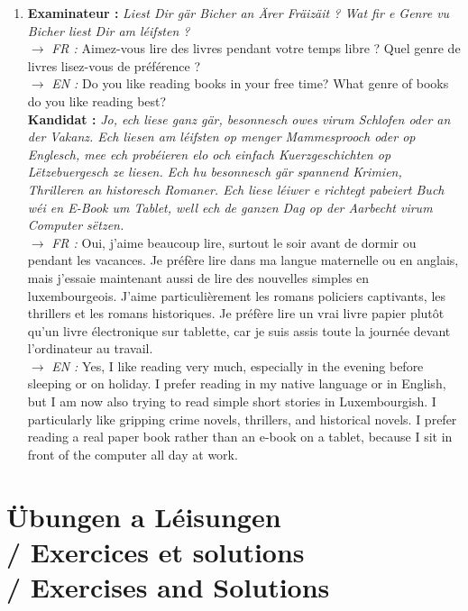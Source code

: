 \begin{enumerate}
    \item \textbf{Examinateur :} \textit{Liest Dir gär Bicher an Ärer Fräizäit ? Wat fir e Genre vu Bicher liest Dir am léifsten ?} \\
    $\rightarrow$ \textit{FR :} Aimez-vous lire des livres pendant votre temps libre ? Quel genre de livres lisez-vous de préférence ? \\
    $\rightarrow$ \textit{EN :} Do you like reading books in your free time? What genre of books do you like reading best? \\
    \textbf{Kandidat :} \textit{Jo, ech liese ganz gär, besonnesch owes virum Schlofen oder an der Vakanz. Ech liesen am léifsten op menger Mammesprooch oder op Englesch, mee ech probéieren elo och einfach Kuerzgeschichten op Lëtzebuergesch ze liesen. Ech hu besonnesch gär spannend Krimien, Thrilleren an historesch Romaner. Ech liese léiwer e richtegt pabeiert Buch wéi en E-Book um Tablet, well ech de ganzen Dag op der Aarbecht virum Computer sëtzen.} \\
    $\rightarrow$ \textit{FR :} Oui, j'aime beaucoup lire, surtout le soir avant de dormir ou pendant les vacances. Je préfère lire dans ma langue maternelle ou en anglais, mais j'essaie maintenant aussi de lire des nouvelles simples en luxembourgeois. J'aime particulièrement les romans policiers captivants, les thrillers et les romans historiques. Je préfère lire un vrai livre papier plutôt qu'un livre électronique sur tablette, car je suis assis toute la journée devant l'ordinateur au travail. \\
    $\rightarrow$ \textit{EN :} Yes, I like reading very much, especially in the evening before sleeping or on holiday. I prefer reading in my native language or in English, but I am now also trying to read simple short stories in Luxembourgish. I particularly like gripping crime novels, thrillers, and historical novels. I prefer reading a real paper book rather than an e-book on a tablet, because I sit in front of the computer all day at work.
\end{enumerate}

\vspace{1.5em}

\section[Übungen a Léisungen / Exercises and Solutions]{Übungen a Léisungen \\/ Exercices et solutions \\/ Exercises and Solutions}

